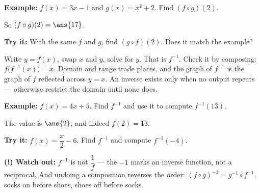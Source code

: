 \documentclass[12pt]{article}
\begin{document}
\begin{examplebox}
\textbf{Example:} $f(x)=3x-1$ and $g(x)=x^2+2$. Find $(f\circ g)(2)$.

So $(f\circ g)(2)=\ans{17}$.
\end{examplebox}

\begin{tryitbox}
\textbf{Try it:} With the same $f$ and $g$, find $(g\circ f)(2)$. Does it match
the example?\\[2pt]
\end{tryitbox}


\begin{formulabox}
Write $y=f(x)$, swap $x$ and $y$, solve for $y$. That is $f^{-1}$.
Check it by composing: $f\bigl(f^{-1}(x)\bigr)=x$. Domain and range trade
places, and the graph of $f^{-1}$ is the graph of $f$ reflected across $y=x$.
An inverse exists only when no output repeats --- otherwise restrict the domain
until none does.
\end{formulabox}

\begin{examplebox}
\textbf{Example:} $f(x)=4x+5$. Find $f^{-1}$ and use it to compute
$f^{-1}(13)$.

The value is $\ans{2}$, and indeed $f(2)=13$.
\end{examplebox}

\begin{tryitbox}
\textbf{Try it:} $f(x)=\dfrac{x}{2}-6$. Find $f^{-1}$ and compute
$f^{-1}(-4)$.\\[2pt]
\end{tryitbox}

\begin{watchoutbox}
\textbf{(!) Watch out:} $f^{-1}$ is not $\dfrac{1}{f}$ --- the $-1$ marks an
inverse function, not a reciprocal. And undoing a composition reverses the
order: $(f\circ g)^{-1}=g^{-1}\circ f^{-1}$, socks on before shoes, shoes off
before socks.
\end{watchoutbox}
\end{document}
